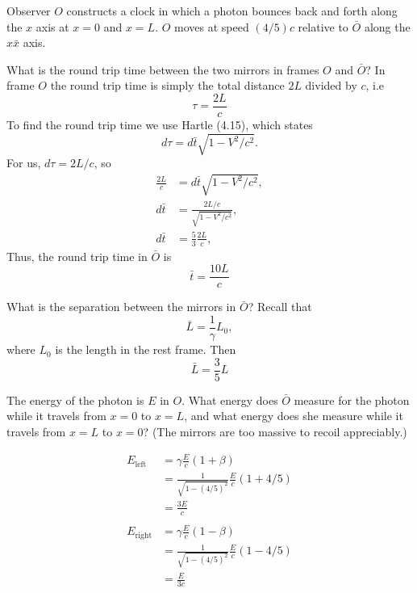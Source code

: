 \documentclass[11pt,largemargins]{homework}
\begin{document}
\question
Observer $O$ constructs a clock in which a photon bounces back and forth along the $x$ axis at $x = 0$ and $x = L$. $O$ moves at speed $(4/5)c$ relative to $\bar{O}$ along the $x \bar{x}$ axis. 
\begin{alphaparts}

\questionpart
What is the round trip time between the two mirrors in frames $O$ and $\bar{O}$?
In frame $O$ the round trip time is simply the total distance $2L$ divided by $c$, i.e
\begin{equation}
\tau = \frac{2L}{c}
\end{equation}
To find the round trip time we use Hartle (4.15), which states
\begin{equation}
d\tau = d\bar{t} \sqrt{1 - V^2 / c^2}.
\end{equation}
For us, $d\tau = 2L/c$, so
\begin{subequations}
\begin{align*}
\frac{2L}{c} &= d\bar{t} \sqrt{1 - V^2 / c^2}, \\
d\bar{t} &= \frac{2L/c}{\sqrt{1 - V^2 / c^2}}, \\
d\bar{t} &= \frac{5}{3} \frac{2L}{c},
\end{align*}
\end{subequations}
Thus, the round trip time in $\bar{O}$ is
\begin{equation}
\bar{t} = \frac{10L}{c}
\end{equation}

\questionpart
What is the separation between the mirrors in $\bar{O}$?
Recall that 
\begin{equation}
\bar{L} = \frac{1}{\gamma} L_{0},
\end{equation}
where $L_{0}$ is the length in the rest frame.
Then
\begin{equation}
\bar{L} = \frac{3}{5} L
\end{equation}

\questionpart
The energy of the photon is $E$ in $O$.  What energy does $\bar{O}$ measure for the photon while it travels from $x = 0$ to $x = L$, and what energy does she measure while it travels from $x = L$ to $x = 0$?  (The mirrors are too massive to recoil appreciably.)

\begin{subequations}
\begin{align*}
E_{\mathrm{left}} &= \gamma \frac{E}{c} (1 + \beta) \\
&= \frac{1}{\sqrt{1 - (4/5)^2}} \frac{E}{c} (1 + 4/5) \\
&= \frac{3E}{c} \\ \\
E_{\mathrm{right}} &= \gamma \frac{E}{c} (1 - \beta) \\
&= \frac{1}{\sqrt{1 - (4/5)^2}} \frac{E}{c} (1 - 4/5) \\ 
&= \frac{E}{3c}
\end{align*}
\end{subequations}


\end{alphaparts}
\end{document}
